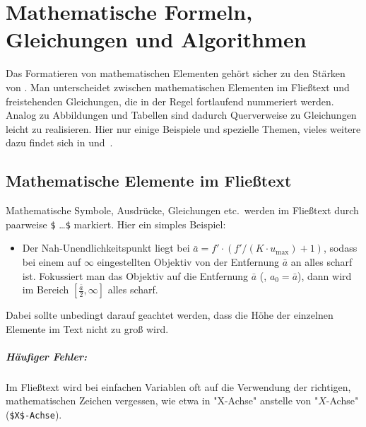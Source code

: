 \chapter[Mathem.\ Formeln etc.]{Mathematische Formeln, Gleichungen und Algorithmen}
\label{cha:Mathematik}

Das Formatieren von mathematischen Elementen gehört sicher zu den
Stär\-ken von \latex. Man unterscheidet zwischen mathematischen Elementen
im Fließtext und freistehenden Gleichungen, die in der Regel
fortlaufend nummeriert werden. Analog zu Abbildungen und Tabellen sind dadurch
Querverweise zu Gleichungen leicht zu realisieren.
Hier nur einige Beispiele und spezielle Themen, vieles weitere dazu findet sich \zB in
\cite[Kap.\ 7]{Kopka2003} und~\cite{Voss2014}.


\section{Mathematische Elemente im Fließtext}

Mathematische Symbole, Ausdrücke, Gleichungen etc.\ werden im Fließtext durch paarweise 
\verb!$! \ldots \verb!$! markiert. Hier ein simples Beispiel:
%
\begin{itemize}
\item[]
Der Nah-Unendlichkeitspunkt liegt bei
$\bar{a} = f' \cdot (f' / (K \cdot u_{\max}) + 1)$,
sodass bei einem auf $\infty$ eingestellten Objektiv von der Entfernung
$\bar{a}$ an alles scharf ist. Fokussiert man das
Objektiv auf die Entfernung $\bar{a}$ (\dah, $a_0 = \bar{a}$), dann wird
im Bereich $[\frac{\bar{a}}{2}, \infty]$ alles scharf.
\end{itemize}
%
Dabei sollte unbedingt darauf geachtet werden, dass die Höhe der einzelnen Elemente im Text nicht zu groß wird. 

\paragraph{Häufiger Fehler:} 
Im Fließtext wird bei einfachen Variablen oft auf die Verwendung der richtigen, mathematischen
Zeichen vergessen, wie etwa in "X-Achse" anstelle von "$X$-Achse" (\verb!$X$-Achse!).

